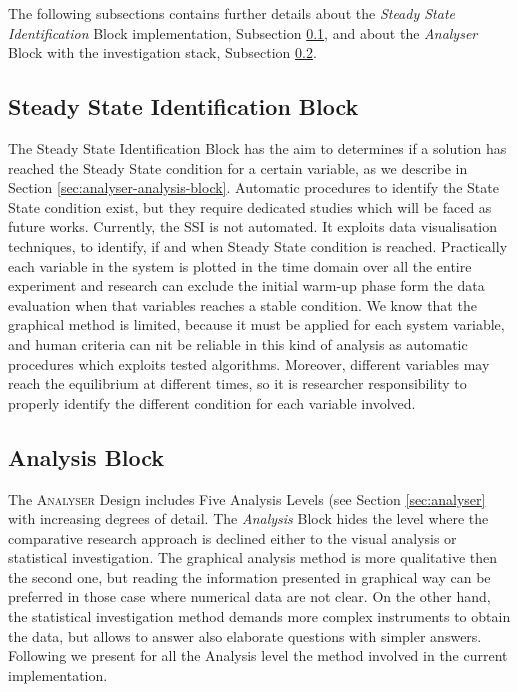 The following subsections contains further details about the \textit{Steady State Identification} Block implementation, Subsection \ref{sec:analyser-impl-ss-block}, and about the \textit{Analyser} Block with the investigation stack, Subsection \ref{sec:analyser-impl-analysis-block}.

\subsection{Steady State Identification Block}\label{sec:analyser-impl-ss-block}

The Steady State Identification Block has the aim to  determines if a solution has reached the Steady State condition for a certain variable, as we describe in Section \ref{sec:analyser-analysis-block}. Automatic procedures to identify the State State condition exist, but they require dedicated studies which will be faced as future works. Currently, the SSI is not automated. It exploits data visualisation techniques, to identify, if and when Steady State condition is reached. Practically each variable in the system is plotted in the time domain over all the entire experiment and research can exclude  the initial warm-up phase form the data evaluation when that variables reaches a stable condition. 
We know that the graphical method is limited, because it must be applied for each system variable, and human criteria can nit be reliable in this kind of analysis as automatic procedures which exploits tested algorithms. Moreover, different variables may reach the equilibrium at different times, so it is researcher responsibility to properly identify the different condition for each variable involved.

\subsection{Analysis Block}\label{sec:analyser-impl-analysis-block}

\noindent The \textsc{Analyser} Design includes Five Analysis Levels (see Section \ref{sec:analyser} with increasing degrees of detail. The \textit{Analysis} Block hides the level where the comparative research approach is declined either to the visual analysis or statistical investigation. The graphical analysis method is more qualitative then the second one, but reading the information presented in graphical way can be preferred in those case where numerical data are not clear. On the other hand, the statistical investigation method demands more complex instruments to obtain the data, but allows to answer also elaborate questions with simpler answers. Following we present for all the Analysis level the method involved in the current implementation.

